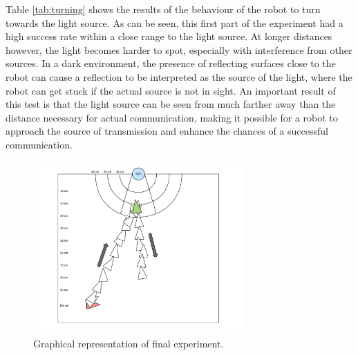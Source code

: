 Table \ref{tab:turning} shows the results of the behaviour of the robot to turn towards the light source.
As can be seen, this first part of the experiment had a high success rate within a close range to the light source.
At longer distances however, the light becomes harder to spot, especially with interference from other sources.
In a dark environment, the presence of reflecting surfaces close to the robot can cause a reflection to be interpreted as the source of the light, where the robot can get stuck if the actual source is not in sight.
An important result of this test is that the light source can be seen from much farther away than the distance necessary for actual communication, making it possible for a robot to approach the source of transmission and enhance the chances of a successful communication.

\begin{figure}[hbt]
\centering
  \includegraphics[height=250px]{img/experiment2}
  \caption{Graphical representation of final experiment.}
  \label{fig:experiment}
\end{figure}

